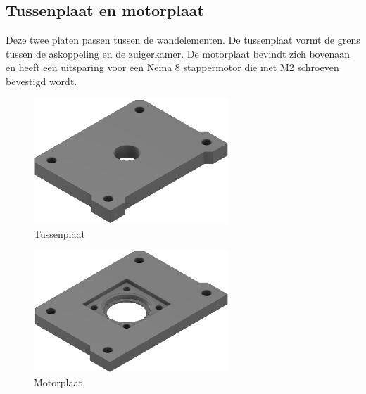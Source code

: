 \subsection{Tussenplaat en motorplaat}
Deze twee platen passen tussen de wandelementen. De tussenplaat vormt de grens tussen de askoppeling en de zuigerkamer. De motorplaat bevindt zich bovenaan en heeft een uitsparing voor een Nema 8 stappermotor die met M2 schroeven bevestigd wordt. 
\\[12pt]\begin{minipage}[t]{0.49\textwidth}
    \vspace{0pt}
    \begin{figure}[H]
        \centering
        \includegraphics[width=0.65\textwidth]{figures/Topp_Wall_w.png}
        \caption{Tussenplaat}\label{fig:tussenplaat}
    \end{figure}
\end{minipage}
\begin{minipage}[t]{0.49\textwidth}
    \vspace{0pt}
    \begin{figure}[H]
        \centering
        \includegraphics[width=0.65\textwidth]{figures/motor_mount_wide.png}
        \caption{Motorplaat}\label{fig:motorplaat}
    \end{figure}
\end{minipage}\\


